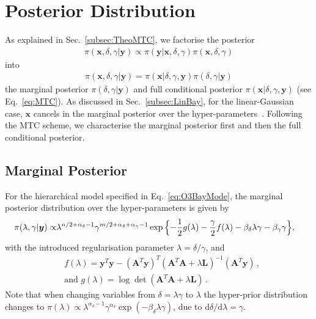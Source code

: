 \section{Posterior Distribution}
\label{sec:FirstO3Post}
As explained in Sec.~\ref{subsec:TheoMTC}, we factorise the posterior
\begin{align}
	\pi( \bm{x}, \delta, \gamma| \bm{y}) \propto \pi(\bm{y}| \bm{x},\delta,\gamma) \pi( \bm{x},  \delta,\gamma)
\end{align}
into 
\begin{align}
	\pi( \bm{x},  \delta,\gamma| \bm{y}) =\pi( \bm{x}| \delta,\gamma, \bm{y})\pi( \delta,\gamma | \bm{y})
\end{align}
the marginal posterior $\pi(\delta ,\gamma| \bm{y})$ and full conditional posterior $\pi( \bm{x}| \delta,\gamma, \bm{y})$ (see Eq.~\ref{eq:MTC}).
As discussed in Sec.~\ref{subsec:LinBay}, for the linear-Gaussian case, $\bm{x}$ cancels in the marginal posterior over the hyper-parameters~\cite{fox2016fast}.
Following the MTC scheme, we characterise the marginal posterior first and then the full conditional posterior.

\subsection{Marginal Posterior}
\label{subsec:FirstMargPost}
For the hierarchical model specified in Eq.~\ref{eq:O3BayMode}, the marginal posterior distribution over the hyper-parameters is given by
\begin{align}
	\pi( \lambda,\gamma  | \bm{y}) \propto &  \lambda^{n/2 + \alpha_{\delta}-1} \gamma^{m/2 + \alpha_{\delta} + \alpha_{\gamma}-1}   \exp{ \Bigl\{ - \frac{1}{2} g ( \lambda) - \frac{\gamma}{2} f ( \lambda) - \beta_{\delta} \lambda  \gamma - \beta_{\gamma} \gamma \Bigr\}},
	\label{eq:MargPostAppl}
\end{align}
with the introduced regularisation parameter $\lambda = \delta / \gamma$, and
\begin{subequations}
	\begin{align}
		&f ( \lambda) = \bm{y}^T \bm{y} - (\bm{A}^T \bm{y})^T (\bm{A}^T  \bm{A} + \lambda \bm{L})^{-1} (\bm{A}^T \bm{y})  \label{eq:fAppl} \, ,  \\
		&\text{and } g(\lambda) = \log \det (\bm{A}^T  \bm{A} + \lambda \bm{L}) \label{eq:gAppl} \, .
	\end{align}
\end{subequations}
Note that when changing variables from $\delta = \lambda \gamma$ to $\lambda$ the hyper-prior distribution changes to $\pi(\lambda) \propto \lambda^{\alpha_{\delta}-1} \gamma^{\alpha_{\delta}} \exp{(- \beta_{\delta} \lambda  \gamma)} $, due to $\text{d}\delta / \text{d} \lambda = \gamma$.

